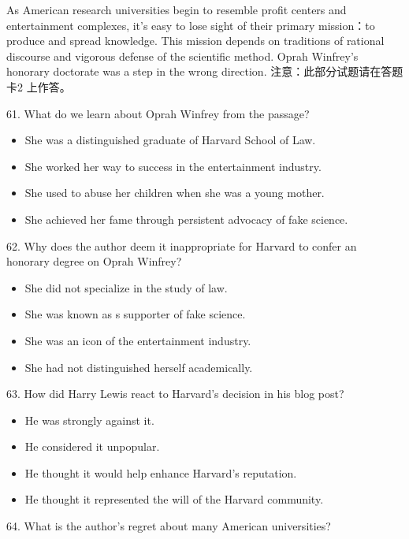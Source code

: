 \documentclass[UTF8,11pt]{ctexart}
\begin{document}
As American research universities begin to resemble profit centers and entertainment complexes, it’s easy to lose sight of their primary mission：to produce and spread knowledge. This mission depends on traditions of rational discourse and vigorous defense of the scientific method. Oprah Winfrey’s honorary doctorate was a step in the wrong direction. 注意：此部分试题请在答题卡2 上作答。


61. What do we learn about Oprah Winfrey from the passage?


\begin{itemize}[leftmargin=2em,itemsep=.2em,topsep=.4em]\item[A.] She was a distinguished graduate of Harvard School of Law.
\item[B.] She worked her way to success in the entertainment industry.
\item[C.] She used to abuse her children when she was a young mother.
\item[D.] She achieved her fame through persistent advocacy of fake science.
\end{itemize}

62. Why does the author deem it inappropriate for Harvard to confer an honorary degree on Oprah Winfrey?


\begin{itemize}[leftmargin=2em,itemsep=.2em,topsep=.4em]\item[A.] She did not specialize in the study of law.
\item[B.] She was known as s supporter of fake science.
\item[C.] She was an icon of the entertainment industry.
\item[D.] She had not distinguished herself academically.
\end{itemize}

63. How did Harry Lewis react to Harvard’s decision in his blog post?


\begin{itemize}[leftmargin=2em,itemsep=.2em,topsep=.4em]\item[A.] He was strongly against it.
\item[B.] He considered it unpopular.
\item[C.] He thought it would help enhance Harvard’s reputation.
\item[D.] He thought it represented the will of the Harvard community.
\end{itemize}

64. What is the author’s regret about many American universities?
\end{document}
